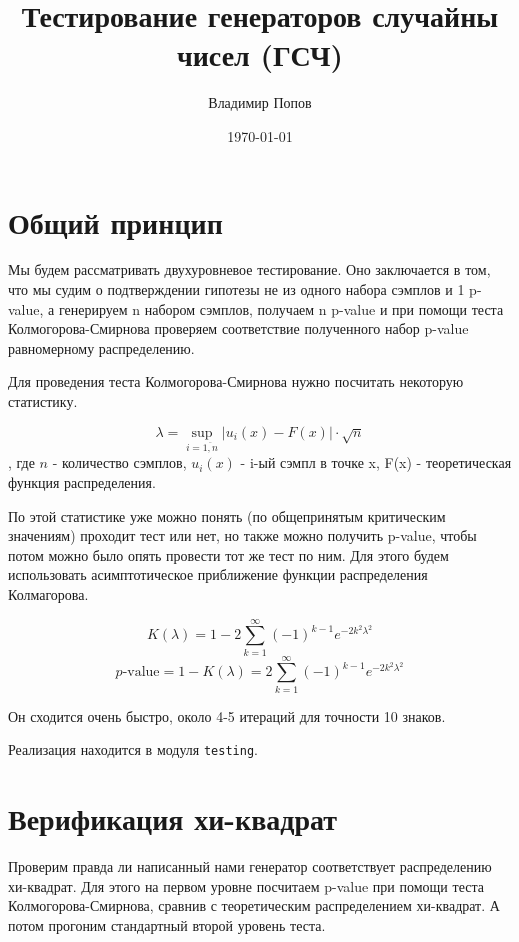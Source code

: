\documentclass[12pt]{extarticle}
\title{Тестирование генераторов случайны чисел (ГСЧ)}
\author{Владимир Попов}
\date{\today}
\begin{document}
\maketitle

\newpage

\tableofcontents

\newpage

\section{Общий принцип}

Мы будем рассматривать двухуровневое тестирование. Оно заключается в том, что мы судим о подтверждении гипотезы не из одного набора сэмплов и 1 p-value, а генерируем n набором сэмплов, получаем n p-value и при помощи теста Колмогорова-Смирнова проверяем соответствие полученного набор p-value равномерному распределению.

Для проведения теста Колмогорова-Смирнова нужно посчитать некоторую статистику. 

\begin{equation}
    \lambda = \sup_{i=\overline{1, n}}|u_i(x)-F(x)| \cdot \sqrt{n}
\end{equation}
, где $n$ - количество сэмплов, $u_i(x)$ - i-ый сэмпл в точке x, F(x) - теоретическая функция распределения.

По этой статистике уже можно понять (по общепринятым критическим значениям) проходит тест или нет, но также можно получить p-value, чтобы потом можно было опять провести тот же тест по ним. Для этого будем использовать асимптотическое приближение функции распределения Колмагорова.

\begin{equation}
    K(\lambda) = 1 - 2\sum_{k=1}^{\infty} (-1)^{k-1} e^{-2k^2\lambda^2}
\end{equation}
\begin{equation}
    p\text{-value} = 1 - K(\lambda) = 2\sum_{k=1}^{\infty} (-1)^{k-1} e^{-2k^2\lambda^2}
\end{equation}

Он сходится очень быстро, около 4-5 итераций для точности 10 знаков.

Реализация находится в модуля \texttt{testing}.

\section{Верификация хи-квадрат}

Проверим правда ли написанный нами генератор соответствует распределению хи-квадрат. Для этого на первом уровне посчитаем p-value при помощи теста Колмогорова-Смирнова, сравнив с теоретическим распределением хи-квадрат. А потом прогоним стандартный второй уровень теста.
\end{document}
